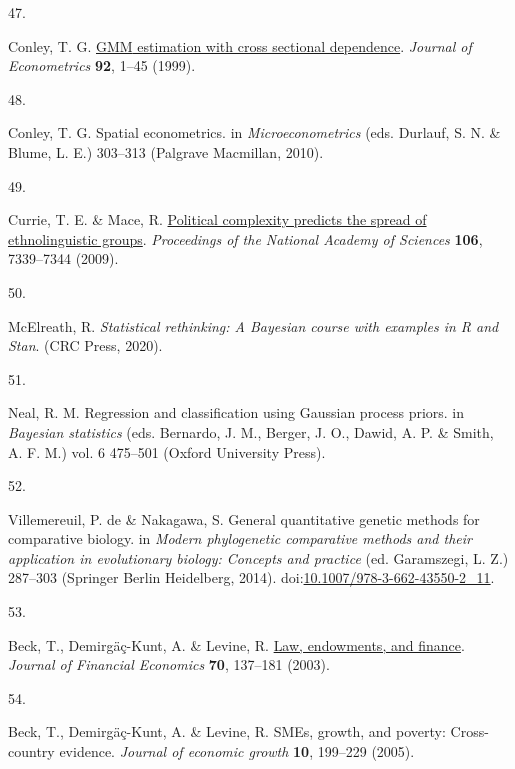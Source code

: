 \documentclass[
  man,floatsintext]{apa6}
\newlength{\cslhangindent}
\newlength{\csllabelwidth}
\newlength{\cslentryspacingunit} %
\newenvironment{CSLReferences}[2] %
 {%
  \setlength{\parindent}{0pt}
  \ifodd #1
  \let\oldpar\par
  \def\par{\hangindent=\cslhangindent\oldpar}
  \fi
  \setlength{\parskip}{#2\cslentryspacingunit}
 }%
 {}
\newcommand{\CSLLeftMargin}[1]{\parbox[t]{\csllabelwidth}{#1}}
\newcommand{\CSLRightInline}[1]{\parbox[t]{\linewidth - \csllabelwidth}{#1}\break}
\begin{document}
\begin{CSLReferences}{0}{0}
\leavevmode{}%
\CSLLeftMargin{47. }%
\CSLRightInline{Conley, T. G. \href{https://doi.org/10.1016/S0304-4076(98)00084-0}{{GMM} estimation with cross sectional dependence}. \emph{Journal of Econometrics} \textbf{92}, 1--45 (1999).}

\leavevmode{}%
\CSLLeftMargin{48. }%
\CSLRightInline{Conley, T. G. Spatial econometrics. in \emph{Microeconometrics} (eds. Durlauf, S. N. \& Blume, L. E.) 303--313 (Palgrave Macmillan, 2010).}

\leavevmode{}%
\CSLLeftMargin{49. }%
\CSLRightInline{Currie, T. E. \& Mace, R. \href{https://doi.org/10.1073/pnas.0804698106}{Political complexity predicts the spread of ethnolinguistic groups}. \emph{Proceedings of the National Academy of Sciences} \textbf{106}, 7339--7344 (2009).}

\leavevmode{}%
\CSLLeftMargin{50. }%
\CSLRightInline{McElreath, R. \emph{Statistical rethinking: A {B}ayesian course with examples in {R} and {Stan}}. (CRC Press, 2020).}

\leavevmode{}%
\CSLLeftMargin{51. }%
\CSLRightInline{Neal, R. M. Regression and classification using {Gaussian} process priors. in \emph{Bayesian statistics} (eds. Bernardo, J. M., Berger, J. O., Dawid, A. P. \& Smith, A. F. M.) vol. 6 475--501 (Oxford University Press).}

\leavevmode{}%
\CSLLeftMargin{52. }%
\CSLRightInline{Villemereuil, P. de \& Nakagawa, S. General quantitative genetic methods for comparative biology. in \emph{Modern phylogenetic comparative methods and their application in evolutionary biology: Concepts and practice} (ed. Garamszegi, L. Z.) 287--303 (Springer Berlin Heidelberg, 2014). doi:\href{https://doi.org/10.1007/978-3-662-43550-2_11}{10.1007/978-3-662-43550-2\_11}.}

\leavevmode{}%
\CSLLeftMargin{53. }%
\CSLRightInline{Beck, T., Demirgäç-Kunt, A. \& Levine, R. \href{https://doi.org/10.1016/S0304-405X(03)00144-2}{Law, endowments, and finance}. \emph{Journal of Financial Economics} \textbf{70}, 137--181 (2003).}

\leavevmode{}%
\CSLLeftMargin{54. }%
\CSLRightInline{Beck, T., Demirgäç-Kunt, A. \& Levine, R. {SME}s, growth, and poverty: Cross-country evidence. \emph{Journal of economic growth} \textbf{10}, 199--229 (2005).}


\end{CSLReferences}
\end{document}
